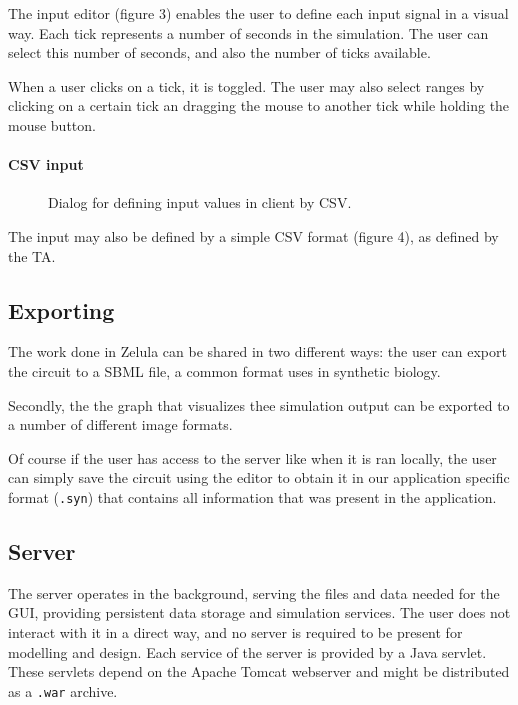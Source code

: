 \noindent The input editor (figure 3) enables the user to define each input signal in a visual way. Each tick represents a number of seconds in the simulation. The user can select this number of seconds, and also the number of ticks available.

When a user clicks on a tick, it is toggled. The user may also select ranges by clicking on a certain tick an dragging the mouse to another tick while holding the mouse button.

\newpage
\paragraph{CSV input}
\begin{figure}[h!]
\centering{}
\caption{Dialog for defining input values in client by CSV.}
\end{figure}

\noindent The input may also be defined by a simple CSV format (figure 4), as defined by the TA.

\subsection{Exporting}
The work done in Zelula can be shared in two different ways: the user can export the circuit to a SBML file, a common format uses in synthetic biology.

Secondly, the the graph that visualizes thee simulation output can be exported to a number of different image formats.

Of course if the user has access to the server like when it is ran locally, the user can simply save the circuit using the editor to obtain it in our application specific format (\verb=.syn=) that contains all information that was present in the application.

\subsection{Server}
The server operates in the background, serving the files and data needed for the GUI, providing persistent data storage and simulation services. The user does not interact with it in a direct way, and no server is required to be present for modelling and design. Each service of the server is provided by a Java servlet. These servlets depend on the Apache Tomcat webserver and might be distributed as a \verb|.war| archive. 
